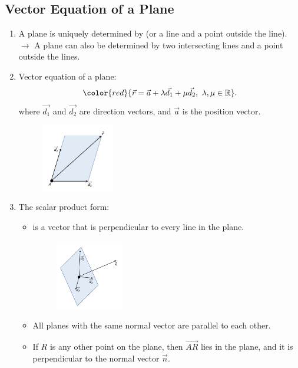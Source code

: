 \documentclass[12pt, a4paper]{article}
\begin{document}
\subsection{Vector Equation of a Plane}
\begin{enumerate}
  \item A plane is uniquely determined by {\color{red}{three points}} (or a line and a point outside the line).\\
  $\rightarrow$ A plane can also be determined by two intersecting lines and a point outside the lines. 
  \item Vector equation of a plane: 
  $${\color{red}{\vec{r}=\vec{a}+\lambda\vec{d_1}+\mu\vec{d_2},\ \lambda,\mu\in\mathbb{R}}}.$$
  where $\vec{d_1}$ and $\vec{d_2}$ are direction vectors, and $\vec{a}$ is the position vector. 
  \begin{figure}[H]
    \centering
    \includegraphics[width=0.3\textwidth]{Fig.3.12.jpg}
  \end{figure}
  \item The scalar product form: 
  \begin{itemize}
    \item \textbf{\color{red}{Normal vector}} is a vector that is perpendicular to every line in the plane. 
    \begin{figure}[H]
      \centering
      \includegraphics[width=0.3\textwidth]{Fig.3.13.jpg}
    \end{figure}
    \item All planes with the same normal vector are parallel to each other. 
    \item If $R$ is any other point on the plane, then $\overrightarrow{AR}$ lies in the plane, and it is perpendicular to the normal vector $\vec{n}$.

\end{itemize}
\end{enumerate}
\end{document}
